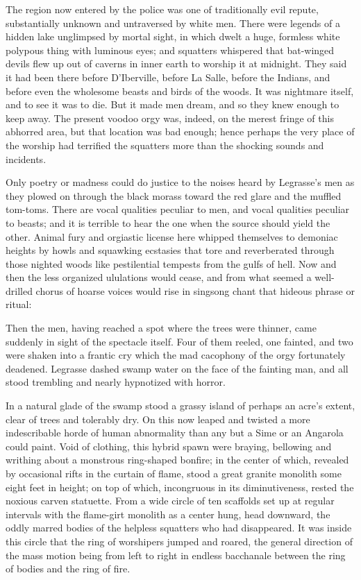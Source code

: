 The region now entered by the police was one of traditionally evil repute, substantially unknown and untraversed by white men. There were legends of a hidden lake unglimpsed by mortal sight, in which dwelt a huge, formless white polypous thing with luminous eyes; and squatters whispered that bat-winged devils flew up out of caverns in inner earth to worship it at midnight. They said it had been there before D’Iberville, before La Salle, before the Indians, and before even the wholesome beasts and birds of the woods. It was nightmare itself, and to see it was to die. But it made men dream, and so they knew enough to keep away. The present voodoo orgy was, indeed, on the merest fringe of this abhorred area, but that location was bad enough; hence perhaps the very place of the worship had terrified the squatters more than the shocking sounds and incidents.

Only poetry or madness could do justice to the noises heard by Legrasse’s men as they plowed on through the black morass toward the red glare and the muffled tom-toms. There are vocal qualities peculiar to men, and vocal qualities peculiar to beasts; and it is terrible to hear the one when the source should yield the other. Animal fury and orgiastic license here whipped themselves to demoniac heights by howls and squawking ecstasies that tore and reverberated through those nighted woods like pestilential tempests from the gulfs of hell. Now and then the less organized ululations would cease, and from what seemed a well-drilled chorus of hoarse voices would rise in singsong chant that hideous phrase or ritual:

\beginblockquote
{}
\endblockquote

Then the men, having reached a spot where the trees were thinner, came suddenly in sight of the spectacle itself. Four of them reeled, one fainted, and two were shaken into a frantic cry which the mad cacophony of the orgy fortunately deadened. Legrasse dashed swamp water on the face of the fainting man, and all stood trembling and nearly hypnotized with horror.

In a natural glade of the swamp stood a grassy island of perhaps an acre’s extent, clear of trees and tolerably dry. On this now leaped and twisted a more indescribable horde of human abnormality than any but a Sime or an Angarola could paint. Void of clothing, this hybrid spawn were braying, bellowing and writhing about a monstrous ring-shaped bonfire; in the center of which, revealed by occasional rifts in the curtain of flame, stood a great granite monolith some eight feet in height; on top of which, incongruous in its diminutiveness, rested the noxious carven statuette. From a wide circle of ten scaffolds set up at regular intervals with the flame-girt monolith as a center hung, head downward, the oddly marred bodies of the helpless squatters who had disappeared. It was inside this circle that the ring of worshipers jumped and roared, the general direction of the mass motion being from left to right in endless bacchanale between the ring of bodies and the ring of fire.

